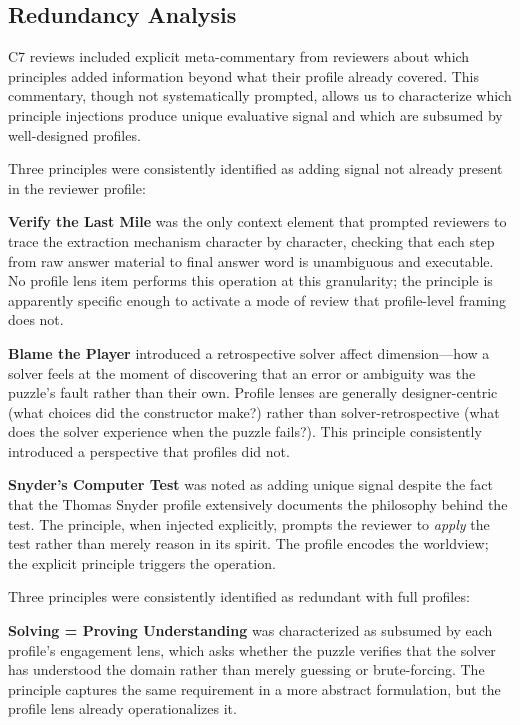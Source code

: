 \subsection{Redundancy Analysis}
\label{sec:redundancy}

C7 reviews included explicit meta-commentary from reviewers about which principles added information beyond what their profile already covered. This commentary, though not systematically prompted, allows us to characterize which principle injections produce unique evaluative signal and which are subsumed by well-designed profiles.

Three principles were consistently identified as adding signal not already present in the reviewer profile:

\textbf{Verify the Last Mile} was the only context element that prompted reviewers to trace the extraction mechanism character by character, checking that each step from raw answer material to final answer word is unambiguous and executable. No profile lens item performs this operation at this granularity; the principle is apparently specific enough to activate a mode of review that profile-level framing does not.

\textbf{Blame the Player} introduced a retrospective solver affect dimension---how a solver feels at the moment of discovering that an error or ambiguity was the puzzle's fault rather than their own. Profile lenses are generally designer-centric (what choices did the constructor make?) rather than solver-retrospective (what does the solver experience when the puzzle fails?). This principle consistently introduced a perspective that profiles did not.

\textbf{Snyder's Computer Test} was noted as adding unique signal despite the fact that the Thomas Snyder profile extensively documents the philosophy behind the test. The principle, when injected explicitly, prompts the reviewer to \emph{apply} the test rather than merely reason in its spirit. The profile encodes the worldview; the explicit principle triggers the operation.

Three principles were consistently identified as redundant with full profiles:

\textbf{Solving = Proving Understanding} was characterized as subsumed by each profile's engagement lens, which asks whether the puzzle verifies that the solver has understood the domain rather than merely guessing or brute-forcing. The principle captures the same requirement in a more abstract formulation, but the profile lens already operationalizes it.

